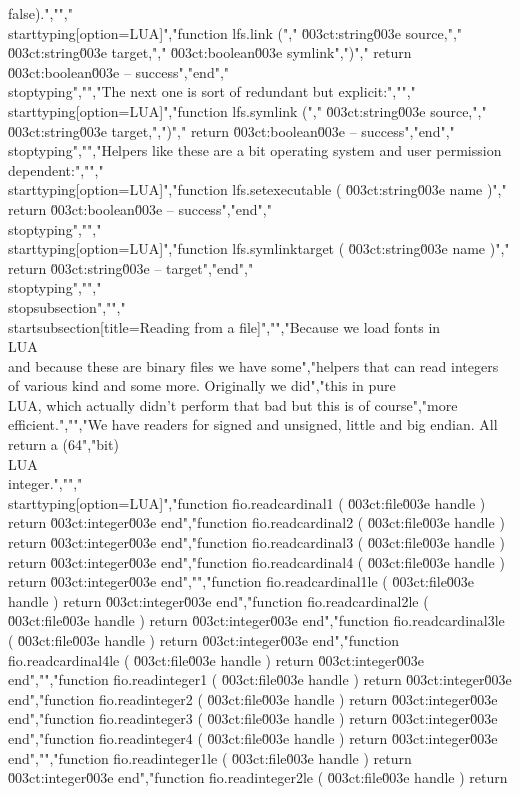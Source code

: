 {false}).","","\\starttyping[option=LUA]","function lfs.link (","    \u003ct:string\u003e  source,","    \u003ct:string\u003e  target,","    \u003ct:boolean\u003e symlink",")","    return \u003ct:boolean\u003e -- success","end","\\stoptyping","","The next one is sort of redundant but explicit:","","\\starttyping[option=LUA]","function lfs.symlink (","    \u003ct:string\u003e  source,","    \u003ct:string\u003e  target,",")","    return \u003ct:boolean\u003e -- success","end","\\stoptyping","","Helpers like these are a bit operating system and user permission dependent:","","\\starttyping[option=LUA]","function lfs.setexecutable ( \u003ct:string\u003e name )","    return \u003ct:boolean\u003e -- success","end","\\stoptyping","","\\starttyping[option=LUA]","function lfs.symlinktarget ( \u003ct:string\u003e name )","    return \u003ct:string\u003e -- target","end","\\stoptyping","","\\stopsubsection","","\\startsubsection[title=Reading from a file]","","Because we load fonts in \\LUA\\ and because these are binary files we have some","helpers that can read integers of various kind and some more. Originally we did","this in pure \\LUA, which actually didn't perform that bad but this is of course","more efficient.","","We have readers for signed and unsigned, little and big endian. All return a (64","bit) \\LUA\\ integer.","","\\starttyping[option=LUA]","function fio.readcardinal1 ( \u003ct:file\u003e handle ) return \u003ct:integer\u003e end","function fio.readcardinal2 ( \u003ct:file\u003e handle ) return \u003ct:integer\u003e end","function fio.readcardinal3 ( \u003ct:file\u003e handle ) return \u003ct:integer\u003e end","function fio.readcardinal4 ( \u003ct:file\u003e handle ) return \u003ct:integer\u003e end","","function fio.readcardinal1le ( \u003ct:file\u003e handle ) return \u003ct:integer\u003e end","function fio.readcardinal2le ( \u003ct:file\u003e handle ) return \u003ct:integer\u003e end","function fio.readcardinal3le ( \u003ct:file\u003e handle ) return \u003ct:integer\u003e end","function fio.readcardinal4le ( \u003ct:file\u003e handle ) return \u003ct:integer\u003e end","","function fio.readinteger1 ( \u003ct:file\u003e handle ) return \u003ct:integer\u003e end","function fio.readinteger2 ( \u003ct:file\u003e handle ) return \u003ct:integer\u003e end","function fio.readinteger3 ( \u003ct:file\u003e handle ) return \u003ct:integer\u003e end","function fio.readinteger4 ( \u003ct:file\u003e handle ) return \u003ct:integer\u003e end","","function fio.readinteger1le ( \u003ct:file\u003e handle ) return \u003ct:integer\u003e end","function fio.readinteger2le ( \u003ct:file\u003e handle ) return 